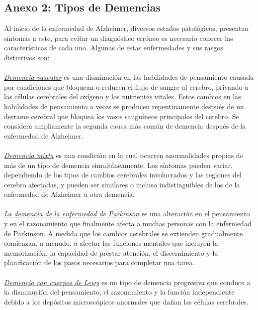 \documentclass[smallextended, 12pt]{article}
\begin{document}
	
	\subsection{Anexo 2: Tipos de Demencias}
	Al inicio de la enfermedad de Alzheimer, diversos estados patol\'ogicos, presentan s\'intomas a este, para evitar un diagn\'ostico err\'oneo es necesario conocer las caracter\'isticas de cada uno. Algunas de estas enfermedades y sus rasgos distintivos son: \cite{ref6} \\
	\\
	\underline{\textit{Demencia vascular}} es una disminuci\'on en las habilidades de pensamiento causada por condiciones que bloquean o reducen el flujo de sangre al cerebro, privando a las c\'elulas cerebrales del ox\'igeno y los nutrientes vitales. Estos cambios en las habilidades de pensamiento a veces se producen repentinamente despu\'es de un derrame cerebral que bloquea los vasos sangu\'ineos principales del cerebro. Se considera ampliamente la segunda causa m\'as com\'un de demencia despu\'es de la enfermedad de Alzheimer. \cite{ref9} \\
	\\
	\underline{\textit{Demencia mixta}} es una condici\'on en la cual ocurren anormalidades propias de m\'as de un tipo de demencia simult\'aneamente. Los s\'intomas pueden variar, dependiendo de los tipos de cambios cerebrales involucrados y las regiones del cerebro afectadas, y pueden ser similares o incluso indistinguibles de los de la enfermedad de Alzheimer u otra demencia. \cite{ref9} \\
	\\
	\underline{\textit{La demencia de la enfermedad de Parkinson}} es una alteraci\'on en el pensamiento y en el razonamiento que finalmente afecta a muchas personas con la enfermedad de Parkinson. A medida que los cambios cerebrales se extienden gradualmente comienzan, a menudo, a afectar las funciones mentales que incluyen la memorizaci\'on, la capacidad de prestar atenci\'on, el discernimiento y la planificaci\'on de los pasos necesarios para completar una tarea. \cite{ref9} \\
	\\
	\underline{\textit{Demencia con cuerpos de Lewy}} es un tipo de demencia progresiva que conduce a la disminuci\'on del pensamiento, el razonamiento y la funci\'on independiente debido a los dep\'ositos microsc\'opicos anormales que da\~nan las c\'elulas cerebrales. \cite{ref9} \\
	\\
\end{document}
